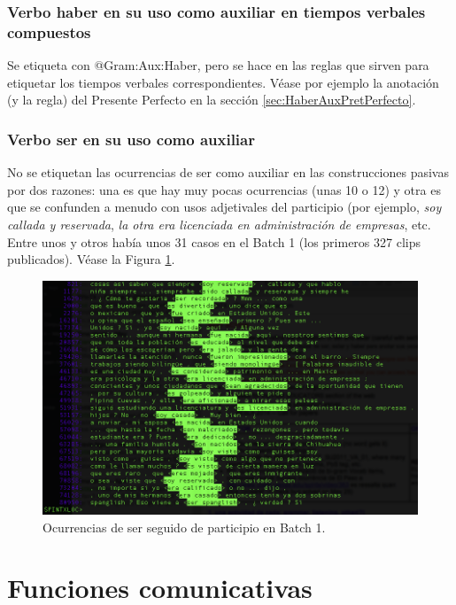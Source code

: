 \documentclass[11pt]{report}
\begin{document}
\subsection{Verbo haber en su uso como auxiliar en tiempos verbales compuestos}
Se etiqueta con @Gram:Aux:Haber, pero se hace en las reglas que sirven para etiquetar los tiempos verbales correspondientes. Véase por ejemplo la anotación (y la regla) del Presente Perfecto en la sección \ref{sec:HaberAuxPretPerfecto}. 

\subsection{Verbo ser en su uso como auxiliar}
No se etiquetan las ocurrencias de ser como auxiliar en las construcciones pasivas por dos razones: una es que hay muy pocas ocurrencias (unas 10 o 12) y otra es que se confunden a menudo con usos adjetivales del participio (por ejemplo, \emph{soy callada y reservada}, \emph{la otra era licenciada en administración de empresas}, etc. Entre unos y otros había unos 31 casos en el Batch 1 (los primeros 327 clips publicados). Véase la Figura \ref{fig:InstancesOfSerPlusParticiple}.

\begin{figure}[htb]

\centering

\includegraphics[scale=0.5]{Figs/InstancesOfSerPlusParticiple.png}

\caption{Ocurrencias de ser seguido de participio en Batch 1.}

\label{fig:InstancesOfSerPlusParticiple}

\end{figure}

\chapter{Funciones comunicativas}
\end{document}
